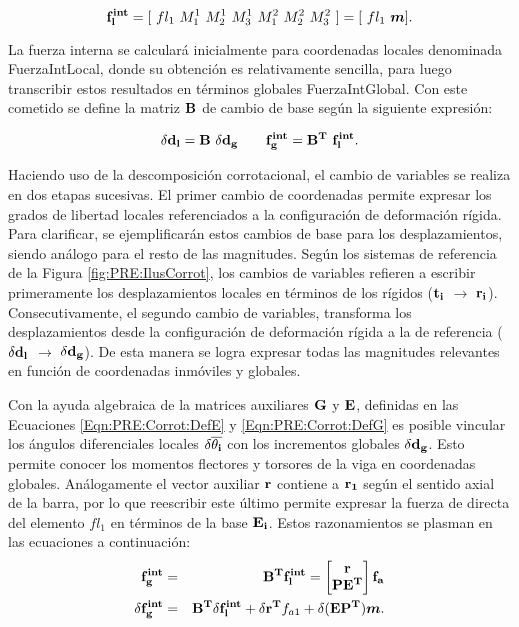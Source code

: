 \begin{equation}\label{Eqn:PRE:FuerzElem}
\bf{ f_l^{int}} =\text{$[~fl_1 ~M^1_1~ M^1_2~ M^1_3~ M^2_1~ M^2_2~ M^2_3~]$} = [\text{$~fl_1$}~\boldsymbol{m}].
\end{equation}

La fuerza interna se calculará inicialmente para coordenadas locales denominada \gls{FuerzaIntLocal}, donde su obtención es relativamente sencilla, para luego transcribir estos resultados en términos globales \gls{FuerzaIntGlobal}. Con este cometido se define la matriz $\bf{B}$ de cambio de base según la siguiente expresión:

\begin{equation}\label{Eqn:PRE:CambioCoord}
	\bf{\delta d_l}=\bf{B}~\bf{\delta d_g} ~~~~~~ 	\bf{f_g^{int}}=\bf{B}^T~\bf{ f_l^{int}}.
\end{equation}

Haciendo uso de la descomposición corrotacional, el cambio de variables se realiza en dos etapas sucesivas. El primer cambio de coordenadas permite expresar los grados de libertad locales referenciados a la configuración de deformación rígida. Para clarificar, se ejemplificarán estos cambios de base para los desplazamientos, siendo análogo para el resto de las magnitudes. Según los sistemas de referencia de la Figura \ref{fig:PRE:IlusCorrot}, los cambios de variables refieren a escribir primeramente los desplazamientos locales en términos de los rígidos ($\bf{t_i}$ $\rightarrow$ $\bf{r_i}$). Consecutivamente, el segundo cambio de variables, transforma los desplazamientos desde la configuración de deformación rígida a la de referencia ($\delta \bf{d_l}$ $\rightarrow$ $\delta \bf{d_g}$). De esta manera se logra expresar todas las magnitudes relevantes en función de coordenadas inmóviles y globales.

Con la ayuda algebraica de la matrices auxiliares $\bf{G}$ y $\bf{E}$, definidas en las Ecuaciones \eqref{Eqn:PRE:Corrot:DefE} y \eqref{Eqn:PRE:Corrot:DefG} es posible vincular los ángulos diferenciales locales $\delta\bf{\overline{\theta_i}}$ con los incrementos globales $\delta \bf{d_g}$. Esto permite conocer los momentos flectores y torsores de la viga en coordenadas globales. Análogamente el vector auxiliar $\bf{r}$ contiene a $\bf{r}_1$ según el sentido axial de la barra, por lo que reescribir este último permite expresar la fuerza de directa del elemento $fl_1$ en términos de la base $\bf{E_i}$. Estos razonamientos se plasman en las ecuaciones a continuación:
\begin{eqnarray}\label{Eqn:PRE:FuerzaInterna}
	\bf{f_g^{int}}&=&\bf{B}^T\bf{f_l^{int}}= \begin{bmatrix}
		\bf{r}\\
		\bf{PE^T}
	\end{bmatrix}\bf{f_a}\\
    \label{Eqn:PRE:DifFuerzaInterna}
	\delta\bf{f_g^{int}}&=&\bf{B}^T\delta\bf{f_l^{int}}+\delta\bf{r}^T \text{$f_{a1}$}+\delta(\bf{EP^T}) \boldsymbol{m}.
\end{eqnarray}

